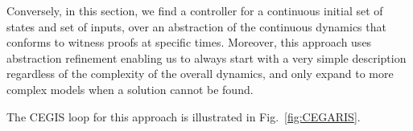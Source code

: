 \documentclass[runningheads,a4paper]{llncs}
\begin{document}



Conversely, in this section, 
we  find a controller for a continuous initial set of states and set of inputs, 
  over an abstraction of the continuous dynamics that conforms to
  witness proofs at specific times. %
  Moreover, this approach uses abstraction refinement enabling us to 
  always start with a very simple description regardless of the complexity of the overall
dynamics, and only expand to more complex models when a solution
cannot be found.

  The CEGIS loop for this approach is illustrated in Fig.~\ref{fig:CEGARIS}.

\end{document}
